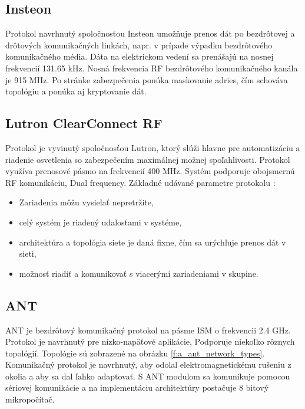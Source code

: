 \documentclass[12pt,a4paper,oneside,openright]{report}
\begin{document}
\subsection{Insteon}
Protokol navrhnutý spoločnosťou Insteon umožňuje prenos dát po bezdrôtovej a drôtových komunikačných linkách, napr. v prípade výpadku bezdrôtového komunikačného média.
Dáta na elektrickom vedení sa prenášajú na nosnej frekvencií 131.65 kHz. Nosná frekvencia RF bezdrôtového komunikačného kanála je 915 MHz.
Po stránke zabezpečenia ponúka maskovanie adries, čím schováva topológiu a ponúka aj kryptovanie dát. \cite{insteon}

\subsection{Lutron ClearConnect RF}
Protokol je vyvinutý spoločnosťou Lutron, ktorý slúži hlavne pre automatizáciu a riadenie osvetlenia so zabezpečením maximálnej možnej spoľahlivosti. Protokol využíva prenosové pásmo na frekvencií 400 MHz. Systém podporuje obojsmernú RF komunikáciu, Dual frequency. Základné udávané parametre protokolu \cite{lutron}:
\begin{itemize}
	\item Zariadenia môžu vysielať nepretržite,
	\item celý systém je riadený udalosťami v systéme,
	\item architektúra a topológia siete je daná fixne, čím sa urýchľuje prenos dát v sieti,
	\item možnosť riadiť a komunikovať s viacerými zariadeniami v skupine.
\end{itemize}
\onehalfspacing

\subsection{ANT}
ANT je bezdrôtový komunikačný protokol na pásme ISM o frekvencii 2.4 GHz. Protokol je navrhnutý pre nízko-napäťové aplikácie, Podporuje niekoľko rôznych topológií. Topológie sú zobrazené na obrázku \ref{f:a_ant_network_types}. Komunikačný protokol je navrhnutý, aby odolal elektromagnetickému rušeniu z okolia a aby sa dal ľahko adaptovať.
S ANT modulom sa komunikuje pomocou sériovej komunikácie a na implementáciu architektúry postačuje 8 bitový mikropočítač.
\end{document}
